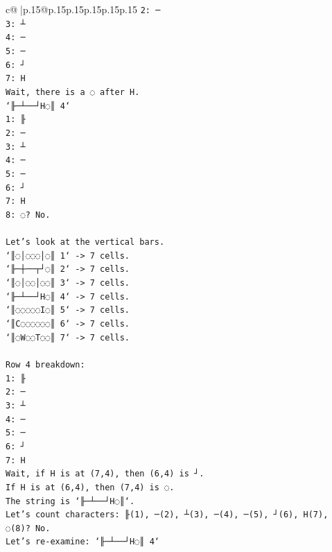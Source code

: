 \documentclass{article}
\begin{document}
{\begin{supertabular}{c@{$\;$}|p{.15\linewidth}@{}p{.15\linewidth}p{.15\linewidth}p{.15\linewidth}p{.15\linewidth}p{.15\linewidth}}
{{{\texttt{2: ─} \\
\texttt{3: ┴} \\
\texttt{4: ─} \\
\texttt{5: ─} \\
\texttt{6: ┘} \\
\texttt{7: H} \\
\texttt{Wait, there is a ◌ after H.} \\
\texttt{`╟─┴──┘H◌║ 4`} \\
\texttt{1: ╟} \\
\texttt{2: ─} \\
\texttt{3: ┴} \\
\texttt{4: ─} \\
\texttt{5: ─} \\
\texttt{6: ┘} \\
\texttt{7: H} \\
\texttt{8: ◌? No.} \\
\\ 
\texttt{Let's look at the vertical bars.} \\
\texttt{`║◌│◌◌◌│◌║ 1` {-}> 7 cells.} \\
\texttt{`╟─┼──┬┘◌║ 2` {-}> 7 cells.} \\
\texttt{`║◌│◌◌│◌◌║ 3` {-}> 7 cells.} \\
\texttt{`╟─┴──┘H◌║ 4` {-}> 7 cells.} \\
\texttt{`║◌◌◌◌◌I◌║ 5` {-}> 7 cells.} \\
\texttt{`║C◌◌◌◌◌◌║ 6` {-}> 7 cells.} \\
\texttt{`║◌W◌◌T◌◌║ 7` {-}> 7 cells.} \\
\\ 
\texttt{Row 4 breakdown:} \\
\texttt{1: ╟} \\
\texttt{2: ─} \\
\texttt{3: ┴} \\
\texttt{4: ─} \\
\texttt{5: ─} \\
\texttt{6: ┘} \\
\texttt{7: H} \\
\texttt{Wait, if H is at (7,4), then (6,4) is ┘.} \\
\texttt{If H is at (6,4), then (7,4) is ◌.} \\
\texttt{The string is `╟─┴──┘H◌║`.} \\
\texttt{Let's count characters: ╟(1), ─(2), ┴(3), ─(4), ─(5), ┘(6), H(7), ◌(8)? No.} \\
\texttt{Let's re{-}examine: `╟─┴──┘H◌║ 4`} \\
}}}
\end{supertabular}}
\end{document}
